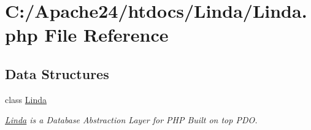 \hypertarget{_linda_8php}{}\section{C\+:/\+Apache24/htdocs/\+Linda/\+Linda.php File Reference}
\label{_linda_8php}
\subsection*{Data Structures}
\begin{DoxyCompactItemize}
\item 
class \hyperlink{class_linda}{Linda}
\begin{DoxyCompactList}\small\item\em \hyperlink{class_linda}{Linda} is a Database Abstraction Layer for P\+H\+P Built on top P\+D\+O. \end{DoxyCompactList}\end{DoxyCompactItemize}

